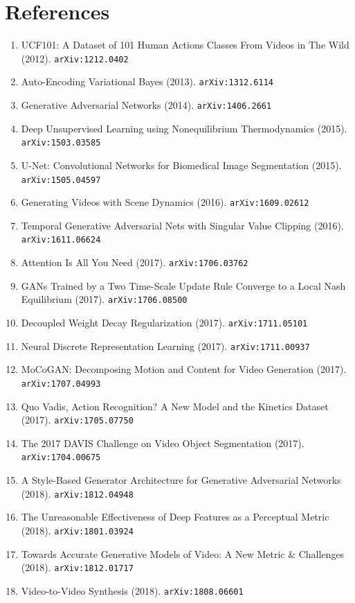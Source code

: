 \documentclass[11pt]{article}
\begin{document}
\section*{References}
\begin{enumerate}\small
  \item UCF101: A Dataset of 101 Human Actions Classes From Videos in The Wild (2012). \texttt{arXiv:1212.0402}
  \item Auto-Encoding Variational Bayes (2013). \texttt{arXiv:1312.6114}
  \item Generative Adversarial Networks (2014). \texttt{arXiv:1406.2661}
  \item Deep Unsupervised Learning using Nonequilibrium Thermodynamics (2015). \texttt{arXiv:1503.03585}
  \item U-Net: Convolutional Networks for Biomedical Image Segmentation (2015). \texttt{arXiv:1505.04597}
  \item Generating Videos with Scene Dynamics (2016). \texttt{arXiv:1609.02612}
  \item Temporal Generative Adversarial Nets with Singular Value Clipping (2016). \texttt{arXiv:1611.06624}
  \item Attention Is All You Need (2017). \texttt{arXiv:1706.03762}
  \item GANs Trained by a Two Time-Scale Update Rule Converge to a Local Nash
  Equilibrium (2017). \texttt{arXiv:1706.08500}
  \item Decoupled Weight Decay Regularization (2017). \texttt{arXiv:1711.05101}
  \item Neural Discrete Representation Learning (2017). \texttt{arXiv:1711.00937}
  \item MoCoGAN: Decomposing Motion and Content for Video Generation (2017). \texttt{arXiv:1707.04993}
  \item Quo Vadis, Action Recognition? A New Model and the Kinetics Dataset (2017). \texttt{arXiv:1705.07750}
  \item The 2017 DAVIS Challenge on Video Object Segmentation (2017). \texttt{arXiv:1704.00675}
  \item A Style-Based Generator Architecture for Generative Adversarial Networks (2018). \texttt{arXiv:1812.04948}
  \item The Unreasonable Effectiveness of Deep Features as a Perceptual Metric (2018). \texttt{arXiv:1801.03924}
  \item Towards Accurate Generative Models of Video: A New Metric \& Challenges (2018). \texttt{arXiv:1812.01717}
  \item Video-to-Video Synthesis (2018). \texttt{arXiv:1808.06601}

\end{enumerate}
\end{document}

